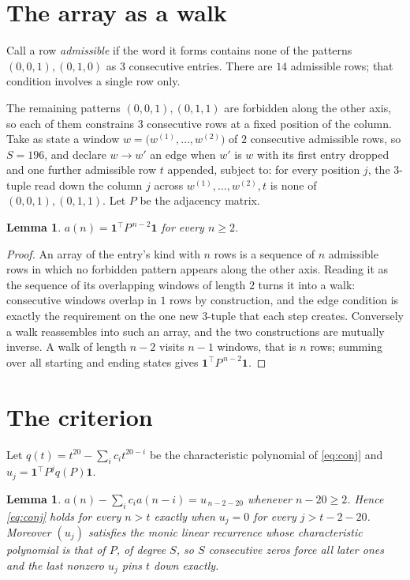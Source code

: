 \documentclass[11pt,a4paper]{article}
\theoremstyle{plain}
\newtheorem{lemma}[theorem]{Lemma}
\theoremstyle{definition}
\begin{document}
\section{The array as a walk}

Call a row \emph{admissible} if the word it forms contains none of the patterns
$(0,0,1), (0,1,0)$ as $3$ consecutive entries. There are $14$ admissible rows; that condition
involves a single row only.

The remaining patterns $(0,0,1), (0,1,1)$ are forbidden along the other axis, so each of them
constrains $3$ consecutive rows at a fixed position of the column. Take as state a
window $w=\bigl(w^{(1)},\dots,w^{(2)}\bigr)$ of $2$ consecutive admissible
rows, so $S=196$, and declare $w\to w'$ an edge when $w'$ is $w$ with its first entry
dropped and one further admissible row $t$ appended, subject to: for every position
$j$, the $3$-tuple read down the column $j$ across $w^{(1)},\dots,w^{(2)},t$
is none of $(0,0,1), (0,1,1)$. Let $P$ be the adjacency matrix.

\begin{lemma}\label{lem:walk}
$a(n)=\mathbf{1}^{\!\top}P^{\,n-2}\mathbf{1}$ for every $n\ge2$.
\end{lemma}

\begin{proof}
An array of the entry's kind with $n$ rows is a sequence of $n$ admissible rows in
which no forbidden pattern appears along the other axis. Reading it as the sequence of its
overlapping windows of length $2$ turns it into a walk: consecutive windows overlap in
$1$ rows by construction, and the edge condition is exactly the requirement on the one
new $3$-tuple that each step creates. Conversely a walk reassembles into such an array,
and the two constructions are mutually inverse. A walk of length $n-2$ visits $n-1$
windows, that is $n$ rows; summing over all starting and ending states gives
$\mathbf{1}^{\!\top}P^{\,n-2}\mathbf{1}$.
\end{proof}

\section{The criterion}

Let $q(t)=t^{20}-\sum_i c_i t^{20-i}$ be the characteristic polynomial of
\eqref{eq:conj} and $u_j=\mathbf{1}^{\!\top}P^{j}q(P)\mathbf{1}$.

\begin{lemma}\label{lem:crit}
$a(n)-\sum_i c_i a(n-i)=u_{\,n-2-20}$ whenever $n-20\ge2$. Hence
\eqref{eq:conj} holds for every $n>t$ exactly when $u_j=0$ for every
$j>t-2-20$. Moreover $(u_j)$ satisfies the monic linear recurrence whose
characteristic polynomial is that of $P$, of degree $S$, so $S$ consecutive zeros force all
later ones and the last nonzero $u_j$ pins $t$ down exactly.
\end{lemma}
\end{document}
